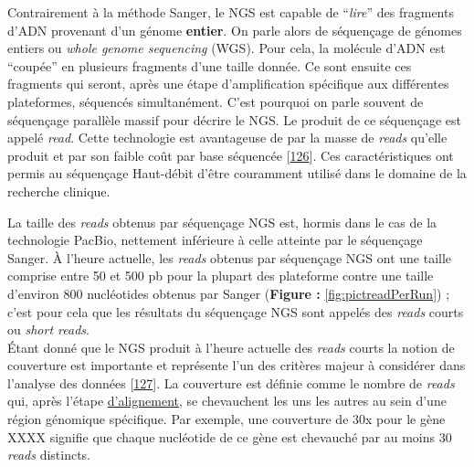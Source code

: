 \documentclass[12pt,a4paper,twoside]{ugathesis}
\theoremstyle{definition}
\theoremstyle{definition}
\theoremstyle{definition}
\theoremstyle{remark}
\begin{document}
Contrairement à la méthode Sanger, le NGS est capable de ``\emph{lire}''
des fragments d'ADN provenant d'un génome \textbf{entier}. On parle
alors de séquençage de génomes entiers ou \emph{whole genome sequencing}
(WGS). Pour cela, la molécule d'ADN est ``coupée'' en plusieurs
fragments d'une taille donnée. Ce sont ensuite ces fragments qui seront,
après une étape d'amplification spécifique aux différentes plateformes,
séquencés simultanément. C'est pourquoi on parle souvent de séquençage
parallèle massif pour décrire le NGS. Le produit de ce séquençage est
appelé \emph{read}. Cette technologie est avantageuse de par la masse de
\emph{reads} qu'elle produit et par son faible coût par base séquencée
{[}\protect\hyperlink{ref-Metzker2010}{126}{]}. Ces caractéristiques ont
permis au séquençage Haut-débit d'être couramment utilisé dans le
domaine de la recherche clinique.

La taille des \emph{reads} obtenus par séquençage NGS est, hormis dans
le cas de la technologie PacBio, nettement inférieure à celle atteinte
par le séquençage Sanger. À l'heure actuelle, les \emph{reads} obtenus
par séquençage NGS ont une taille comprise entre 50 et 500 pb pour la
plupart des plateforme contre une taille d'environ 800 nucléotides
obtenus par Sanger (\textbf{Figure :} \ref{fig:pictreadPerRun}) ; c'est
pour cela que les résultats du séquençage NGS sont appelés des
\emph{reads} courts ou \emph{short reads}.\\
Étant donné que le NGS produit à l'heure actuelle des \emph{reads}
courts la notion de couverture est importante et représente l'un des
critères majeur à considérer dans l'analyse des données
{[}\protect\hyperlink{ref-Sims2014}{127}{]}. La couverture est définie
comme le nombre de \emph{reads} qui, après l'étape
\protect\hyperlink{lalignement}{d'alignement}, se chevauchent les uns
les autres au sein d'une région génomique spécifique. Par exemple, une
couverture de 30x pour le gène XXXX signifie que chaque nucléotide de ce
gène est chevauché par au moins 30 \emph{reads} distincts.

\newpage
\end{document}
